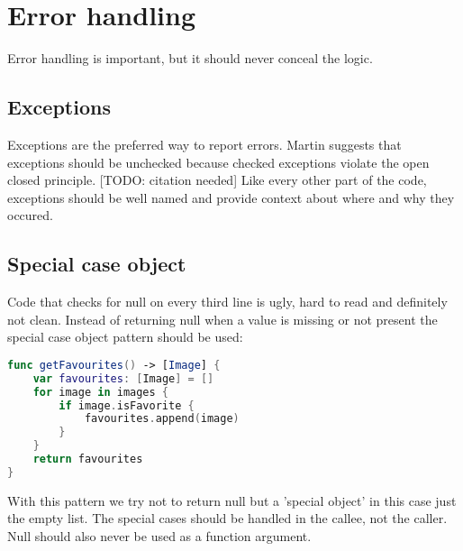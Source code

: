 \section{Error handling}
Error handling is important, but it should never conceal the logic.

\subsection{Exceptions}
Exceptions are the preferred way to report errors. Martin suggests that exceptions should be unchecked because checked exceptions violate the open closed principle. [TODO: citation needed]
Like every other part of the code, exceptions should be well named and provide context about where and why they occured.

\subsection{Special case object}
Code that checks for null on every third line is ugly, hard to read and definitely not clean. Instead of returning null when a value is missing or not present the special case object pattern should be used:

\begin{lstlisting}[language=Swift, caption={Function that uses the special case object pattern}]
func getFavourites() -> [Image] {
    var favourites: [Image] = []
    for image in images {
        if image.isFavorite {
            favourites.append(image)
        }
    }
    return favourites
}
\end{lstlisting}

With this pattern we try not to return null but a 'special object' in this case just the empty list. The special cases should be handled in the callee, not the caller. Null should also never be used as a function argument.
